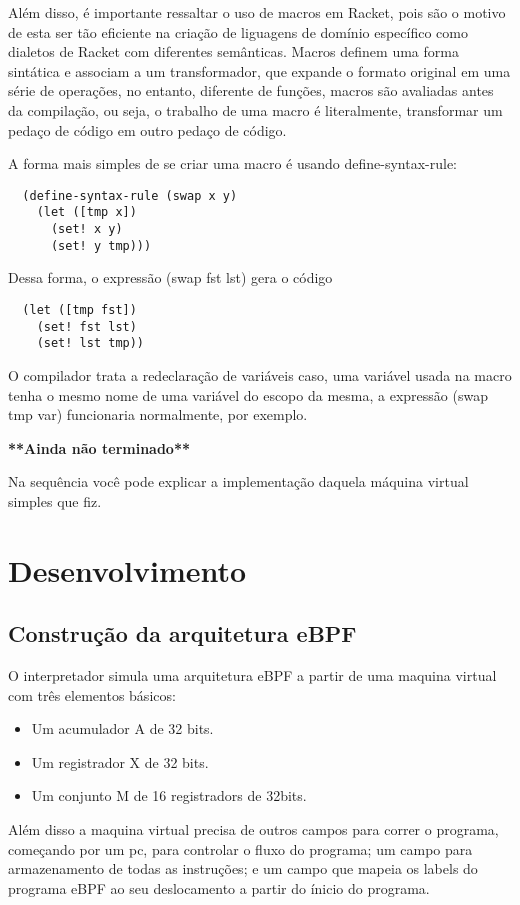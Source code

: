 \documentclass[paper=a4, fontsize=12pt]{article}
\theoremstyle{definition}
\begin{document}
Além disso, é importante ressaltar o uso de macros em Racket, pois são o motivo de esta ser tão
eficiente na criação de liguagens de domínio específico como dialetos de Racket com diferentes semânticas.
Macros definem uma forma sintática e associam a um transformador, que expande o formato original em uma
série de operações, no entanto, diferente de funções, macros são avaliadas antes da compilação, ou seja,
o trabalho de uma macro é literalmente, transformar um pedaço de código em outro pedaço de código.

A forma mais simples de se criar uma macro é usando define-syntax-rule:

\begin{lstlisting}
  (define-syntax-rule (swap x y)
    (let ([tmp x])
      (set! x y)
      (set! y tmp)))
\end{lstlisting}

Dessa forma, o expressão (swap fst lst) gera o código

\begin{lstlisting}
  (let ([tmp fst])
    (set! fst lst)
    (set! lst tmp))
\end{lstlisting}

O compilador trata a redeclaração de variáveis caso, uma variável usada na macro
tenha o mesmo nome de uma variável do escopo da mesma, a expressão (swap tmp var)
funcionaria normalmente, por exemplo.


\textbf{**Ainda não terminado**}

Na sequência você pode explicar a implementação daquela
máquina virtual simples que fiz.

\section{Desenvolvimento}
\subsection{Construção da arquitetura eBPF}

O interpretador simula uma arquitetura eBPF a partir de uma maquina virtual com três
elementos básicos:
\begin{itemize}
\item Um acumulador A de 32 bits.
\item Um registrador X de 32 bits.
\item Um conjunto M de 16 registradors de 32bits.
\end{itemize}

Além disso a maquina virtual precisa de outros campos para correr o programa, começando
por um pc, para controlar o fluxo do programa; um campo para armazenamento de todas as 
instruções; e um campo que mapeia os labels do programa eBPF ao seu deslocamento a partir
do ínicio do programa.
\end{document}
